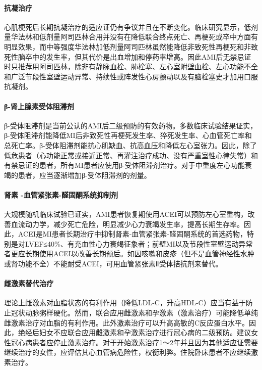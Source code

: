 \paragraph{抗凝治疗}

心肌梗死后长期抗凝治疗的适应证仍有争议并且在不断变化。临床研究显示，低剂量华法林和低剂量阿司匹林合用并没有在降低联合终点死亡、再梗死或卒中方面有明显效果，而中等强度华法林加低剂量阿司匹林虽然能降低非致死性再梗死和非致死性脑卒中的发生率，但其代价是出血增加和停药率增高。因此AMI后无禁忌证时只推荐用阿司匹林，除非有静脉血栓、肺栓塞、左心室附壁血栓、左心功能不全和广泛节段性室壁运动异常、持续性或阵发性心房颤动以及有脑栓塞史才加用口服抗凝剂。

\paragraph{β-肾上腺素受体阻滞剂}

β-受体阻滞剂是当前公认的AMI后二级预防的有效药物。多数临床试验结果证实，β-受体阻滞剂能降低MI后非致死性再梗死发生率、猝死发生率、心血管死亡率和总死亡率。β-受体阻滞剂能抗心肌缺血、抗高血压和降低左心室张力。因此，除了低危患者（心功能正常或接近正常、再灌注治疗成功、没有严重室性心律失常）和有禁忌证的患者，所有MI患者应使用β-受体阻滞剂治疗。对于中重度左心功能衰竭的患者，应当逐渐增加β-受体阻滞剂的剂量。

\paragraph{肾素 -血管紧张素-醛固酮系统抑制剂}

大规模随机临床试验已证实，AMI患者恢复期使用ACEI可以预防左心室重构，改善血流动力学，减少死亡危险，明显减少心力衰竭发生率，提高长期生存率。因此，ACEI是MI患者长期治疗中抑制肾素-血管紧张素-醛固酮系统的首选药物，特别是对LVEF≤40\%、有充血性心力衰竭征象者；前壁MI以及节段性室壁运动异常者更应长期使用ACEI以改善长期预后。如因咳嗽和皮疹（但不是血管神经性水肿或肾功能不全）不能耐受ACEI，可用血管紧张素Ⅱ受体拮抗剂来替代。

\paragraph{雌激素替代治疗}

理论上雌激素对血脂状态的有利作用（降低LDL-C，升高HDL-C）应当有益于防止冠状动脉粥样硬化。然而，联合应用雌激素和孕激素（激素治疗）可能降低单纯雌激素治疗对血脂的有利作用。此外激素治疗可以升高高敏的C反应蛋白水平。因此，绝经后妇女不应联合应用雌激素和孕激素治疗进行冠心病的二级预防。建议女性冠心病患者应停止激素治疗。对于开始激素治疗1～2年并且因为其他适应证需要继续治疗的女性，应评估其心血管病危险性，权衡利弊。住院卧床患者不应继续激素治疗。


